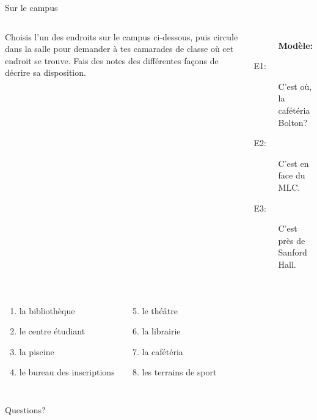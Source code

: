 \documentclass{beamer}
\begin{document}
  \begin{frame}{Sur le campus}
    \begin{columns}
        Choisis l'un des endroits sur le campus ci-dessous, puis circule dans la salle pour demander à tes camarades de classe où cet endroit se trouve.
        Fais des notes des différentes façons de décrire sa disposition. \\
        {\small
        \begin{description}
          \item[] \textbf{Modèle:}
          \item[E1:] C'est où, la cafétéria Bolton?
          \item[E2:] C'est en face du MLC.
          \item[E3:] C'est près de Sanford Hall.
        \end{description}
        }
    \end{columns}
    \vspace{0.25cm}
    \begin{columns}
        \begin{enumerate}
          \item la bibliothèque
          \item le centre étudiant
          \item la piscine
          \item le bureau des inscriptions
        \end{enumerate}
        \begin{enumerate}
          \setcounter{enumi}{4}
          \item le théâtre
          \item la librairie
          \item la cafétéria
          \item les terrains de sport
        \end{enumerate}
    \end{columns}
  \end{frame}

  \begin{frame}{}
    \begin{center}
      \Large Questions?
    \end{center}
  \end{frame}
\end{document}
